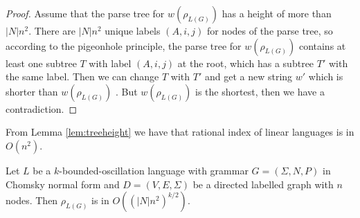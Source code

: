 \begin{proof}
 Assume that the parse tree for $w(\rho_{L(G)})$ has a height of more than $|N|n^2$. There are $|N|n^2$ unique labels $(A, i, j)$ for nodes of the parse tree, so according to the pigeonhole principle, the parse tree for $w(\rho_{L(G)})$ contains at least one subtree $T$ with label $(A, i, j)$ at the root, which has a subtree $T'$ with the same label. Then we can change $T$ with $T'$ and get a new string $w'$ which is shorter than $w(\rho_{L(G)})$ . But $w(\rho_{L(G)})$ is the shortest, then we have a contradiction.

\end{proof}
From Lemma \ref{lem:treeheight} we have that rational index of linear languages is in $O(n^2)$. 
\begin{theorem}
\label{oscbnddim}
Let $L$ be a $k$-bounded-oscillation language with grammar $G = (\Sigma, N, P)$ in Chomsky normal form and $D=(V, E, \Sigma)$ be a directed labelled graph with $n$ nodes. Then $\rho_{L(G)}$ is in $O((|N|n^2)^{k/2})$.
\end{theorem}
